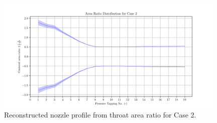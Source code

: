 \documentclass{article}
\begin{document}
\begin{figure}[H]
    \centering
    \includegraphics[width=0.98\textwidth]{../Supersonic_Nozzle/area_ratio_distribution.png}
    \caption{Reconstructed nozzle profile from throat area ratio for Case 2.}
    \label{fig:area_distribution}
\end{figure}
\end{document}
